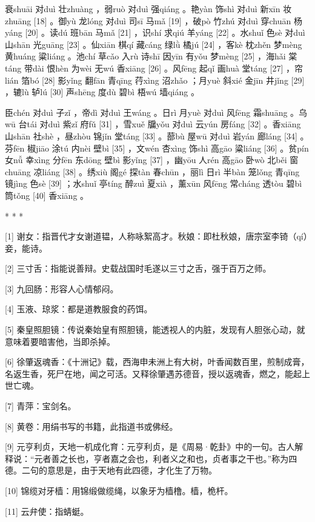 \documentclass[12pt,UTF8]{ctexbook}
\begin{document}
衰shuāi 对duì 壮zhuàng ，弱ruò 对duì 强qiáng 。艳yàn 饰shì 对duì 新xīn 妆zhuāng [18] 。御yù 龙lóng 对duì 司sī 马mǎ [19] ，破pò 竹zhú 对duì 穿chuān 杨yáng [20] 。读dú 班bān 马mǎ [21] ，识shí 求qiú 羊yáng [22] 。水shuǐ 色sè 对duì 山shān 光guāng [23] 。仙xiān 棋qí 藏cáng 绿lǜ 橘jú [24] ，客kè 枕zhěn 梦mèng 黄huáng 粱liáng 。池chí 草cǎo 入rù 诗shī 因yīn 有yǒu 梦mèng [25] ，海hǎi 棠táng 带dài 恨hèn 为wèi 无wú 香xiāng [26] 。风fēng 起qǐ 画huà 堂táng [27] ，帘lián 箔bó [28] 影yǐng 翻fān 青qīng 荇xìng 沼zhǎo ；月yuè 斜xié 金jīn 井jǐng [29] ，辘lù 轳lú [30] 声shēng 度dù 碧bì 梧wú 墙qiáng 。

臣chén 对duì 子zǐ ，帝dì 对duì 王wáng 。日rì 月yuè 对duì 风fēng 霜shuāng 。乌wū 台tái 对duì 紫zǐ 府fǔ [31] ，雪xuě 牖yǒu 对duì 云yún 房fáng [32] 。香xiāng 山shān 社shè ，昼zhòu 锦jǐn 堂táng [33] 。蔀bù 屋wū 对duì 岩yán 廊láng [34] 。芬fēn 椒jiāo 涂tú 内nèi 壁bì [35] ，文wén 杏xìng 饰shì 高gāo 粱liáng [36] 。贫pín 女nǚ 幸xìng 分fēn 东dōng 壁bì 影yǐng [37] ，幽yōu 人rén 高gāo 卧wò 北běi 窗chuāng 凉liáng [38] 。绣xiù 阁gé 探tàn 春chūn ，丽lì 日rì 半bàn 笼lǒng 青qīng 镜jìng 色sè [39] ；水shuǐ 亭tíng 醉zuì 夏xià ，薰xūn 风fēng 常cháng 透tòu 碧bì 筒tǒng [40] 香xiāng 。



* * *



[1] 谢女：指晋代才女谢道韫，人称咏絮高才。秋娘：即杜秋娘，唐宗室李锜（qí）妾，能诗。

[2] 三寸舌：指能说善辩。史载战国时毛遂以三寸之舌，强于百万之师。

[3] 九回肠：形容人心情郁闷。

[4] 玉液、琼浆：都是道教服食的药饵。

[5] 秦皇照胆镜：传说秦始皇有照胆镜，能透视人的内脏，发现有人胆张心动，就意味着要暗害他，当即杀掉。

[6] 徐肇返魂香：《十洲记》载，西海申未洲上有大树，叶香闻数百里，煎制成膏，名返生香，死尸在地，闻之可活。又释徐肇遇苏德音，授以返魂香，燃之，能起上世亡魂。

[7] 青萍：宝剑名。

[8] 黄卷：用绢书写的书籍，此指道书或佛经。

[9] 元亨利贞，天地一机成化育：元亨利贞，是《周易·乾卦》中的一句。古人解释说：“元者善之长也，亨者嘉之会也，利者义之和也，贞者事之干也。”称为四德。二句的意思是，由于天地有此四德，才化生了万物。

[10] 锦缆对牙樯：用锦缎做缆绳，以象牙为樯橹。樯，桅杆。

[11] 云弁使：指蜻蜓。
\end{document}

